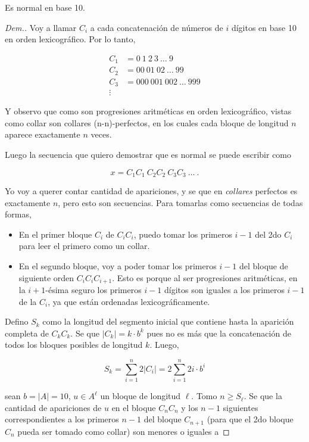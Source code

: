 \documentclass{article}
\theoremstyle{definition} %
\begin{document}
Es normal en base 10.

\begin{proof}[Dem.]

    Voy a llamar $C_i$ a cada concatenación de números de $i$ dígitos en base 10
    en orden lexicográfico. Por lo tanto,

    \begin{align*}
        C_1 &= 0\ 1\ 2\ 3\ \dots\ 9\\
        C_2 &= 00\ 01\ 02\ \dots\ 99 \\
        C_3 &= 000\ 001\ 002\ \dots\ 999 \\
        \vdots
    \end{align*}

    Y observo que como son progresiones aritméticas en orden lexicográfico,
    vistas como collar son collares (n-n)-perfectos, en los cuales cada bloque
    de longitud $n$ aparece exactamente $n$ veces.

    Luego la secuencia que quiero demostrar que es normal se puede escribir como

    $$x = C_1C_1\ C_2 C_2\ C_3 C_3\ \dots\ .$$

    Yo voy a querer contar cantidad de apariciones, y se que en
    \textit{collares} perfectos es exactamente $n$, pero esto son secuencias.
    Para tomarlas como secuencias de todas formas,

    \begin{itemize}
        \item En el primer bloque $C_i$ de $C_iC_i$, puedo tomar los primeros $i
        - 1$ del 2do $C_i$ para leer el primero como un collar.
        \item En el segundo bloque, voy a poder tomar los primeros $i - 1$ del
        bloque de siguiente orden $C_iC_iC_{i+1}$. Esto es porque al ser
        progresiones aritméticas, en la $i+1$-ésima seguro los primeros $i - 1$
        dígitos son iguales a los primeros $i - 1$ de la $C_i$, ya que están
        ordenadas lexicográficamente.
    \end{itemize}

    Defino $S_k$ como la longitud del segmento inicial que contiene hasta la
    aparición completa de $C_k C_k$. Se que $|C_k| = k \cdot b^k$ pues no es más
    que la concatenación de todos los bloques posibles de longitud $k$. Luego,

    \[S_k = \sum_{i=1}^n 2|C_i| = 2\sum_{i=1}^n 2i \cdot b^i \]

    sean $b = |A| = 10$, $u \in A^\ell$ un bloque de longitud $\ell$. Tomo $n
    \geq S_\ell$. Se que la cantidad de apariciones de $u$ en el bloque $C_nC_n$
    y los $n-1$ siguientes correspondientes a los primeros $n-1$ del bloque
    $C_{n+1}$ (para que el 2do bloque $C_n$ pueda ser tomado como collar)
    son menores o iguales a


\end{proof}
\end{document}

